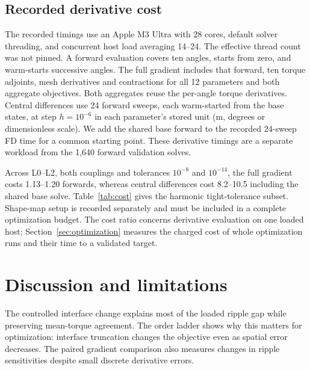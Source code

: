 \documentclass{anvil-paper}
\begin{document}
\subsection{Recorded derivative cost}
The recorded timings use an Apple M3 Ultra with 28 cores, default solver
threading, and concurrent host load averaging 14--24. The effective thread
count was not pinned. A forward evaluation covers ten angles, starts from
zero, and warm-starts successive angles. The full gradient includes that
forward, ten torque adjoints, mesh derivatives and contractions for all
12 parameters and both aggregate objectives. Both aggregates reuse the
per-angle torque derivatives. Central differences use 24 forward sweeps,
each warm-started from the base states, at step $h=10^{-6}$ in each
parameter's stored unit (m, degrees or dimensionless scale). We add the
shared base forward to the recorded 24-sweep FD time for a common starting
point. These derivative timings are a separate workload from the 1,640
forward validation solves.

Across L0--L2, both couplings and tolerances $10^{-8}$ and $10^{-14}$, the
full gradient costs 1.13--1.20 forwards, whereas central differences cost
8.2--10.5 including the shared base solve. Table~\ref{tab:cost} gives the harmonic tight-tolerance subset.
Shape-map setup is recorded separately and must be included in a complete
optimization budget. The cost ratio concerns derivative evaluation
on one loaded host; Section~\ref{sec:optimization} measures the charged
cost of whole optimization runs and their time to a validated target.

\begin{table}[H]\centering\small
\caption{Recorded harmonic-model cost at relative tolerance $10^{-14}$,
initial design and full current. Times are seconds for ten-angle sweeps;
FD includes the shared base sweep, and setup is a one-time shape-map cost.}
\label{tab:cost}
\end{table}



\section{Discussion and limitations}
The controlled interface change explains most of the loaded ripple gap
while preserving mean-torque agreement. The order ladder shows why this
matters for optimization: interface truncation changes the objective even
as spatial error decreases. The paired gradient comparison also measures
changes in ripple sensitivities despite small discrete derivative errors.
\end{document}
